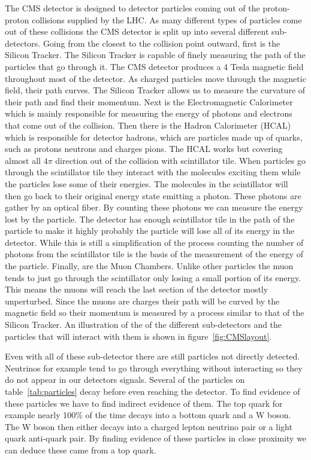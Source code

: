 The CMS detector is designed to detector particles coming out of the proton-proton collisions supplied by the LHC. As many different types of particles come out of these collisions the CMS detector is split up into several different sub-detectors. Going from the closest to the collision point outward, first is the Silicon Tracker. The Silicon Tracker is capable of finely measuring the path of the particles that go through it. The CMS detector produces a 4 Tesla magnetic field throughout most of the detector. As charged particles move through the magnetic field, their path curves. The Silicon Tracker allows us to measure the curvature of their path and find their momentum. Next is the Electromagnetic Calorimeter which is mainly responsible for measuring the energy of photons and electrons that come out of the collision. Then there is the Hadron Calorimeter (HCAL) which is responsible for detector hadrons, which are particles made up of quarks, such as protons neutrons and charges pions. The HCAL works but covering almost all $4\pi$ direction out of the collision with scintillator tile. When particles go through the scintillator tile they interact with the molecules exciting them while the particles lose some of their energies. The molecules in the scintillator will then go back to their original energy state emitting a photon. These photons are gather by an optical fiber. By counting these photons we can measure the energy lost by the particle. The detector has enough scintillator tile in the path of the particle to make it highly probably the particle will lose all of its energy in the detector. While this is still a simplification of the process counting the number of photons from the scintillator tile is the basis of the measurement of the energy of the particle. Finally, are the Muon Chambers. Unlike other particles the muon tends to just go through the scintillator only losing a small portion of its energy. This means the muons will reach the last section of the detector mostly unperturbed. Since the muons are charges their path will be curved by the magnetic field so their momentum is measured by a process similar to that of the Silicon Tracker. An illustration of the of the different sub-detectors and the particles that will interact with them is shown in figure~\ref{fig:CMSlayout}.

Even with all of these sub-detector there are still particles not directly detected. Neutrinos for example tend to go through everything without interacting so they do not appear in our detectors signals. Several of the particles on table~\ref{tab:particles} decay before even reaching the detector. To find evidence of these particles we have to find indirect evidence of them. The top quark for example nearly 100\% of the time decays into a bottom quark and a W boson. The W boson then either decays into a charged lepton neutrino pair or a light quark anti-quark pair. By finding evidence of these particles in close proximity we can deduce these came from a top quark.


